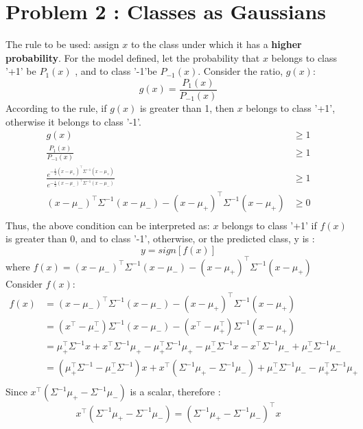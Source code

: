 \documentclass{article}
\begin{document}
\section{Problem 2 : Classes as Gaussians}
The rule to be used: assign $x$ to the class under which it has a
\textbf{higher probability}. For the model defined, let the probability that $x$ belongs to class '+1' be $P_{1}(x)$ , and to class '-1'be $P_{-1}(x)$.
Consider the ratio, $g(x)$:
$$g(x) = \frac{P_{1}(x)}{P_{-1}(x)}$$
According to the rule, if $g(x)$ is greater than 1, then $x$ belongs to class '+1', otherwise it belongs to class '-1'.
\begin{equation*}
\begin{aligned}
g(x) &\geq 1 \\
\frac{P_{1}(x)}{P_{-1}(x)} &\geq 1 \\
\frac{e^{-\frac{1}{2}(x-\mu_+)^\top \Sigma^{-1}(x-\mu_+)}}{e^{-\frac{1}{2}(x-\mu_-)^\top \Sigma^{-1}(x-\mu_-)}} &\geq 1 \\
(x-\mu_-)^\top \Sigma^{-1}(x-\mu_-) - (x-\mu_+)^\top \Sigma^{-1}(x-\mu_+) &\geq 0 \\
\end{aligned}
\end{equation*}
Thus, the above condition can be interpreted as: $x$ belongs to class '+1' if $f(x)$ is greater than 0, and to class '-1', otherwise, or the predicted class, y is :
$$y = sign[f(x)]$$
where $f(x) = (x-\mu_-)^\top \Sigma^{-1}(x-\mu_-) - (x-\mu_+)^\top \Sigma^{-1}(x-\mu_+)$ \\
Consider $f(x)$:
\begin{equation*}
\begin{aligned}
f(x) &= (x-\mu_-)^\top \Sigma^{-1}(x-\mu_-) - (x-\mu_+)^\top \Sigma^{-1}(x-\mu_+) \\
&= (x^\top -\mu_-^\top )\Sigma^{-1}(x-\mu_-) - (x^\top -\mu_+^\top ) \Sigma^{-1}(x-\mu_+) \\
&= \mu_+^\top \Sigma^{-1}x + x^\top \Sigma^{-1}\mu_+ - \mu_+^\top \Sigma^{-1}\mu_+ -\mu_-^\top \Sigma^{-1}x -  x^\top \Sigma^{-1}\mu_- +  \mu_-^\top \Sigma^{-1}\mu_-\\
&= (\mu_+^\top \Sigma^{-1} - \mu_-^\top \Sigma^{-1})x + x^\top (\Sigma^{-1}\mu_+ -\Sigma^{-1}\mu_-) + \mu_-^\top \Sigma^{-1}\mu_- - \mu_+^\top \Sigma^{-1}\mu_+\\
\end{aligned}
\end{equation*}
Since $x^\top (\Sigma^{-1}\mu_+ -\Sigma^{-1}\mu_-)$ is a scalar, therefore : $$x^\top (\Sigma^{-1}\mu_+ -\Sigma^{-1}\mu_-) = (\Sigma^{-1}\mu_+ -\Sigma^{-1}\mu_-)^\top x  $$
\end{document}
